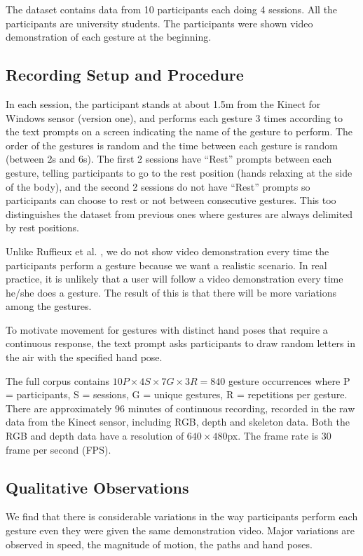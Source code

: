 The dataset contains data from 10 participants each
doing 4 sessions. All the participants are university students.
The participants were shown video demonstration of each gesture at the beginning. 

\subsection{Recording Setup and Procedure}
In each session, the participant stands at about 1.5m from the Kinect
for Windows sensor (version one), and performs each gesture 3 times
according to the text prompts on a screen indicating the name of the gesture to
perform.
The order of the gestures is random and the time between each gesture is random
(between 2s and 6s). The first 2 sessions have ``Rest'' prompts between each
gesture, telling participants to go to the rest position (hands relaxing at the
side of the body), and the second 2 sessions do not have ``Rest'' prompts so
participants can choose to rest or not between consecutive gestures. This too
distinguishes the dataset from previous ones \cite{Ruffieux2013, guyon13} where
gestures are always delimited by rest positions.

Unlike Ruffieux et al. \cite{Ruffieux2013}, we do not show video demonstration
every time the participants perform a gesture because we want a
realistic scenario. In real practice, it is unlikely that a user will follow a
video demonstration every time he/she does a gesture. The result of this is that
there will be more variations among the gestures.

To motivate movement for gestures with distinct hand poses that
require a continuous response, the text prompt asks participants to draw
random letters in the air with the specified hand pose. 

The full corpus contains $
10P \times 4S \times 7G \times 3R = 840$ gesture occurrences
where P = participants, S = sessions, G = unique gestures, R = repetitions per
gesture. There are approximately 96 minutes of continuous recording,
recorded in the raw data from the Kinect sensor, including RGB, depth and
skeleton data. Both the RGB and depth data have a resolution of
$640\times480$px. The frame rate is 30 frame per second (FPS).

\subsection{Qualitative Observations}
We find that there is considerable variations in the way participants perform
each gesture even they were given the same demonstration video. Major variations
are observed in speed, the magnitude of motion, the paths and hand poses.

